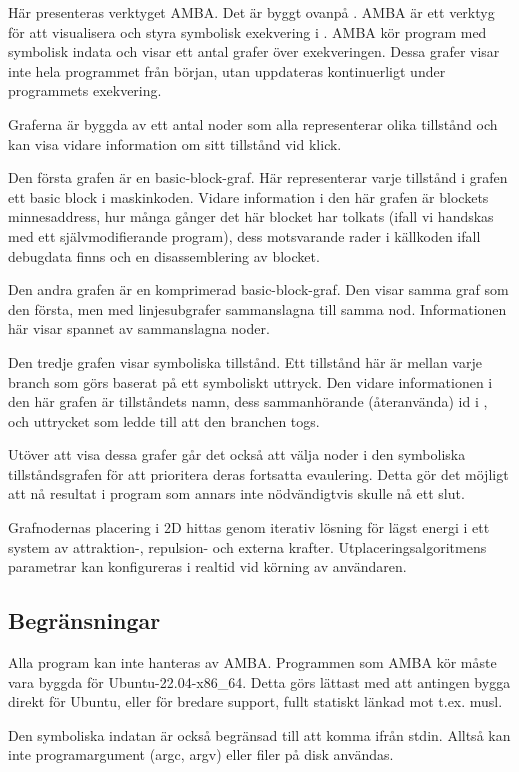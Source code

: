 Här presenteras verktyget AMBA. Det är byggt ovanpå \stoe. AMBA är ett
verktyg för att visualisera och styra symbolisk exekvering i \stoe.
AMBA kör program med symbolisk indata och visar ett antal grafer över
exekveringen. Dessa grafer visar inte hela programmet från början,
utan uppdateras kontinuerligt under programmets exekvering.

Graferna är byggda av ett antal noder som alla representerar olika
tillstånd och kan visa vidare information om sitt tillstånd vid klick.

Den första grafen är en basic-block-graf. Här representerar varje
tillstånd i grafen ett basic block i maskinkoden. Vidare information i
den här grafen är blockets minnesaddress, hur många gånger det här
blocket har tolkats (ifall vi handskas med ett självmodifierande
program), dess motsvarande rader i källkoden ifall debugdata finns och
en disassemblering av blocket.

Den andra grafen är en komprimerad basic-block-graf. Den visar samma
graf som den första, men med linjesubgrafer sammanslagna till samma
nod. Informationen här visar spannet av sammanslagna noder.

Den tredje grafen visar symboliska tillstånd. Ett tillstånd här är
mellan varje branch som görs baserat på ett symboliskt
uttryck. Den vidare informationen i den här grafen är tillståndets
namn, dess sammanhörande (återanvända) id i \stoe, och uttrycket som
ledde till att den branchen togs.

Utöver att visa dessa grafer går det också att välja noder i den
symboliska tillståndsgrafen för att prioritera deras fortsatta
evaulering. Detta gör det möjligt att nå resultat i program som annars
inte nödvändigtvis skulle nå ett slut.

Grafnodernas placering i 2D hittas genom iterativ lösning för lägst
energi i ett system av attraktion-, repulsion- och externa
krafter. Utplaceringsalgoritmens parametrar kan konfigureras i realtid
vid körning av användaren.

\subsection{Begränsningar}

Alla program kan inte hanteras av AMBA. Programmen som AMBA kör måste
vara byggda för Ubuntu-22.04-x86\_64. Detta görs lättast med att
antingen bygga direkt för Ubuntu, eller för bredare support, fullt
statiskt länkad mot t.ex. musl.

Den symboliska indatan är också begränsad till att komma ifrån
stdin. Alltså kan inte programargument (argc, argv) eller filer på
disk användas.
